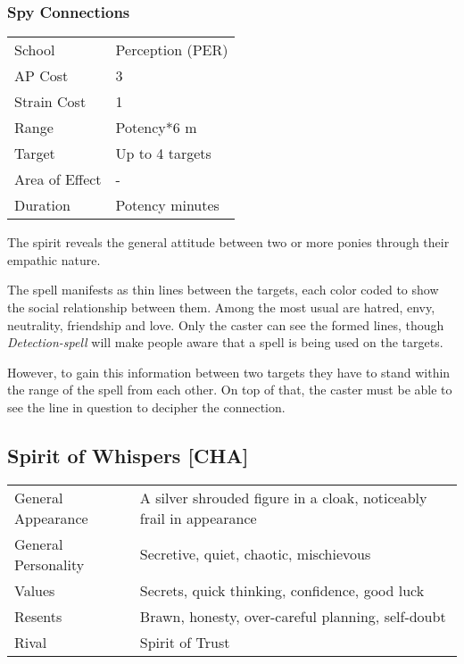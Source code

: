 \documentclass[11pt,a4paper,twocolumn]{book}
\begin{document}
\subsubsection*{Spy Connections}
{
	\begin{tabu} to 75mm{| X[l,4] | X[l,7] |}
		\hline
		School 			& Perception (PER) 		\\
		AP Cost	      	& 3 					\\
		Strain Cost     & 1 					\\
		Range     		& Potency*6 m			\\
		Target      	& Up to 4 targets		\\
		Area of Effect  & - 	 				\\
		Duration     	& Potency minutes		\\ \hline
	\end{tabu}
	
}

\medskip

The spirit reveals the general attitude between two or more ponies through their empathic nature.

The spell manifests as thin lines between the targets, each color coded to show the social relationship between them. Among the most usual are hatred, envy, neutrality, friendship and love. Only the caster can see the formed lines, though \textit{Detection-spell} will make people aware that a spell is being used on the targets.

However, to gain this information between two targets they have to stand within the range of the spell from each other. On top of that, the caster must be able to see the line in question to decipher the connection.


\subsection*{Spirit of Whispers [CHA]}
{
	\begin{tabu} to 75mm{| X[l,4] | X[l,8] |}
		\hline
		General Appearance  & A silver shrouded figure in a cloak, noticeably frail in appearance \\
		General Personality & Secretive, quiet, chaotic, mischievous                              \\
		Values              & Secrets, quick thinking, confidence, good luck                      \\
		Resents             & Brawn, honesty, over-careful planning, self-doubt                   \\
		Rival               & Spirit of Trust                                                     \\ \hline
	\end{tabu}
	
}
\end{document}
